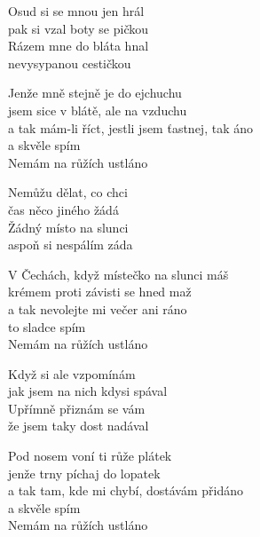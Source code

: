 
\ve{}
Osud si se mnou jen hrál\\
pak si vzal boty se pičkou\\
Rázem mne do bláta hnal\\
nevysypanou cestičkou

Jenže mně stejně je do ejchuchu\\
jsem sice v blátě, ale na vzduchu\\
a tak mám-li říct, jestli jsem ťastnej, tak áno\\
a skvěle spím\\
Nemám na růžích ustláno

\ve{}
Nemůžu dělat, co chci\\
čas něco jiného žádá\\
Žádný místo na slunci\\
aspoň si nespálím záda

V Čechách, když místečko na slunci máš\\
krémem proti závisti se hned maž\\
a tak nevolejte mi večer ani ráno\\
to sladce spím\\
Nemám na růžích ustláno

\ve{}
Když si ale vzpomínám\\
jak jsem na nich kdysi spával\\
Upřímně přiznám se vám\\
že jsem taky dost nadával

Pod nosem voní ti růže plátek\\
jenže trny píchaj do lopatek\\
a tak tam, kde mi chybí, dostávám přidáno\\
a skvěle spím\\
Nemám na růžích ustláno

\esong{}